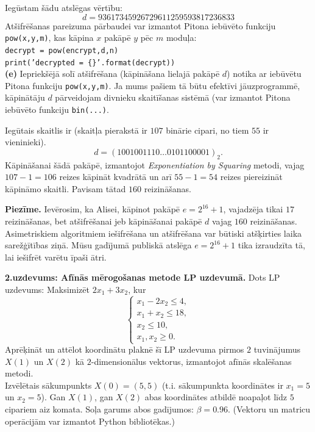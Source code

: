 \documentclass[a4paper,12pt]{article}
\begin{document}
{Iegūstam šādu atslēgas vērtību:
$$d = 93617345926729611259593817236833$$
Atšifrēšanas pareizuma pārbaudei var izmantot Pitona iebūvēto funkciju {\tt pow(x,y,m)}, kas
kāpina $x$ pakāpē $y$ pēc $m$ moduļa:\\


{\tt decrypt = pow(encrypt,d,n)}\\
{\tt print('decrypted = \{\}'.format(decrypt))}\\


{\bf (e)} Iepriekšējā solī atšifrēšana (kāpināšana lielajā pakāpē $d$)
notika ar iebūvētu Pitona funkciju {\tt pow(x,y,m)}. Ja mums pašiem tā
būtu efektīvi jāuzprogrammē,
kāpinātāju $d$ pārveidojam divnieku skaitīšanas sistēmā (var izmantot Pitona
iebūvēto funkciju {\tt bin(...)}.

Iegūtais skaitlis ir (skaitļa pierakstā ir $107$ binārie cipari, no tiem $55$ ir vieninieki).
$$d = (1001001110\ldots{}0101100001)_2.$$
Kāpināšanai šādā pakāpē, izmantojot {\em Exponentiation by Squaring} metodi,
vajag $107-1 = 106$ reizes kāpināt kvadrātā un arī $55-1 = 54$ reizes
piereizināt kāpināmo skaitli. Pavisam tātad $160$ reizināšanas.

{\bf Piezīme.} Ievērosim, ka Alisei, kāpinot pakāpē $e = 2^{16}+1$, vajadzēja tikai $17$
reizināšanas, bet atšifrēšanai jeb kāpināšanai pakāpē $d$ vajag $160$ reizināšanas.
Asimetriskiem algoritmiem 
iešifrēšana un atšifrēšana var būtiski atšķirties laika sarežģītības ziņā. Mūsu gadījumā
publiskā atslēga $e = 2^{16}+1$ tika
izraudzīta tā, lai iešifrēt varētu īpaši ātri.

}




\vspace{6pt}
{\bf 2.uzdevums: Afīnās mērogošanas metode LP uzdevumā.}
Dots LP uzdevums: Maksimizēt $2x_1 + 3x_2$, kur
$$\left\{ \begin{array}{l}
x_1 - 2x_2 \leq 4,\\
x_1 + x_2 \leq 18,\\
x_2 \leq 10,\\
x_1,x_2 \geq 0.
\end{array} \right.$$
Aprēķināt un attēlot koordinātu plaknē šī LP uzdevuma pirmos $2$ tuvinājumus 
$X(1)$ un $X(2)$ kā $2$-dimensionālus vektorus, izmantojot 
afīnās skalēšanas metodi.\\ 
Izvēlētais sākumpunkts $X(0) = (5,5)$ (t.i. sākumpunkta
koordinātes ir $x_1 = 5$ un $x_2 = 5$). Gan $X(1)$, gan $X(2)$ abas koordinātes
atbildē noapaļot līdz $5$ cipariem aiz komata. Soļa garums abos 
gadījumos: $\beta = 0.96$. (Vektoru un matricu operācijām var izmantot Python bibliotēkas.)
\end{document}
